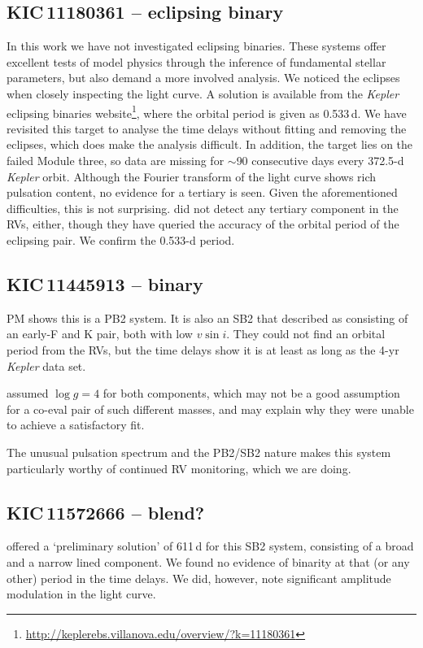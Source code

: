 \documentclass[a4paper,fleqn,usenatbib]{mnras}
\begin{document}
\subsection{KIC\,11180361 -- eclipsing binary}
In this work we have not investigated eclipsing binaries. These systems offer excellent tests of model physics through the inference of fundamental stellar parameters, but also demand a more involved analysis. We noticed the eclipses when closely inspecting the light curve. A solution is available from the \textit{Kepler} eclipsing binaries website\footnote{\url{http://keplerebs.villanova.edu/overview/?k=11180361}}, where the orbital period is given as 0.533\,d. We have revisited this target to analyse the time delays without fitting and removing the eclipses, which does make the analysis difficult. In addition, the target lies on the failed Module three, so data are missing for $\sim$90 consecutive days every 372.5-d \textit{Kepler} orbit. Although the Fourier transform of the light curve shows rich pulsation content, no evidence for a tertiary is seen. Given the aforementioned difficulties, this is not surprising. \citeauthor{lampensetal2017} did not detect any tertiary component in the RVs, either, though they have queried the accuracy of the orbital period of the eclipsing pair. We confirm the 0.533-d period.


\subsection{KIC\,11445913 -- binary}
PM shows this is a PB2 system. It is also an SB2 that \citeauthor{lampensetal2017} described as consisting of an early-F and K pair, both with low $v\sin i$. They could not find an orbital period from the RVs, but the time delays show it is at least as long as the 4-yr \textit{Kepler} data set.

\citeauthor{lampensetal2017} assumed $\log g = 4$ for both components, which may not be a good assumption for a co-eval pair of such different masses, and may explain why they were unable to achieve a satisfactory fit.

The unusual pulsation spectrum and the PB2/SB2 nature makes this system particularly worthy of continued RV monitoring, which we are doing.


\subsection{KIC\,11572666 -- blend?}
\citeauthor{lampensetal2017} offered a `preliminary solution' of 611\,d for this SB2 system, consisting of a broad and a narrow lined component. We found no evidence of binarity at that (or any other) period in the time delays. We did, however, note significant amplitude modulation in the light curve.
\end{document}
